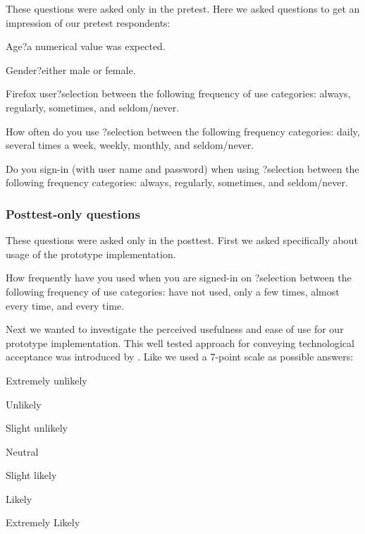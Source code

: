 These questions were asked only in the pretest. Here we asked questions to
get an impression of our pretest respondents:

\begin{items}
  \item Age{}?\dash{}a numerical value was expected.
  \item Gender{}?\dash{}either male or female.
  \item Firefox user{}?\dash{}selection between the following frequency of use
    categories: always, regularly, sometimes, and seldom/never.
  \item How often do you use \urort{}?\dash{}selection between the following
    frequency categories: daily, several times a week, weekly, monthly,
    and seldom/never.
  \item Do you sign-in (with user name and password) when using
    \urort{}?\dash{}selection between the following frequency
    categories: always, regularly, sometimes, and seldom/never.
\end{items}

\subsubsection{Posttest-only questions}

These questions were asked only in the posttest. First we asked specifically
about usage of the prototype implementation.

\begin{items}
  \item How frequently have you used \latest{} when you are
    signed-in on \urort{}?\dash{}selection between the following
    frequency of use categories: have not used, only a few times, almost
    every time, and every time.
\end{items}

Next we wanted to investigate the perceived usefulness and ease of use for
our prototype implementation. This well tested approach for conveying
technological acceptance was introduced by \citet{davis89}.
Like \citet[]{davis89} we used a 7-point scale as possible answers:

\begin{items}
  \item Extremely unlikely
  \item Unlikely
  \item Slight unlikely
  \item Neutral
  \item Slight likely
  \item Likely
  \item Extremely Likely
\end{items}

